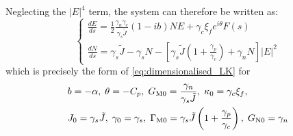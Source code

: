 %
Neglecting the $|E|^{4}$ term, the system can therefore be written as:
%
\begin{equation*}
\left\{\begin{array}{l}
\displaystyle \frac{d E}{d s}=\frac{1}{2} \frac{\gamma_{n}\gamma_c}{\gamma_{s} \tilde{J}}(1-ib) N E+\gamma_c\xi_{f} e^{i\theta} F(s) \\ 
\displaystyle \frac{d N}{d s}=\gamma_{s} \tilde{J}-\gamma_{s} N-\left[\gamma_{s} \tilde{J}\left(1+\frac{\gamma_{p}}{\gamma_{c}}\right)+\gamma_{n} N\right]|E|^{2}\end{array}\right.
\end{equation*}
%
which is precisely the form of \eqref{eq:dimensionalised_LK} for
%
$$
\begin{aligned}
& b = -\alpha, \; \theta=-C_{p}, \; G_\text{M0}=\frac{\gamma_{n}}{\gamma_{s} \tilde{J}}, \; \kappa_{0}=\gamma_{c} \xi_{f}, \\
& J_{0}=\gamma_{s} \tilde{J}, \; \gamma_{0}=\gamma_{s}, \; \Gamma_\text{M0}=\gamma_{s} \tilde{J}\left(1+\frac{\gamma_{p}}{\gamma_{c}}\right), \; G_\text{N0}=\gamma_{n}
\end{aligned}
$$
%
%
